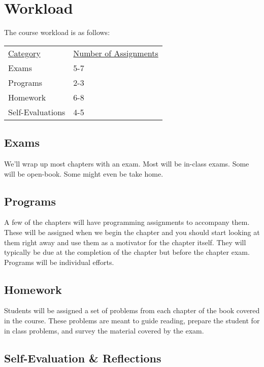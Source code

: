 \documentclass[10pt]{article}
\begin{document}
\section{Workload}

The course workload is as follows:
\begin{center}
  \begin{tabular}{ll}
    \underline{Category} & \underline{Number of Assignments} \\
    Exams & 5-7 \\
    Programs & 2-3 \\
    Homework & 6-8 \\
    Self-Evaluations & 4-5
  \end{tabular}
\end{center}

\subsection*{Exams}

We'll wrap up most chapters with an exam. Most will be in-class exams. Some will be open-book. Some might even be take home.

\subsection*{Programs}

A few of the chapters will have programming assignments to accompany them. These will be assigned when we begin the chapter and you should start looking at them right away and use them as a motivator for the chapter itself. They will typically be due at the completion of the chapter but before the chapter exam. Programs will be individual efforts.

\subsection*{Homework}

Students will be assigned a set of problems from each chapter of the book covered in the course. These problems are meant to guide reading, prepare the student for in class problems, and survey the material covered by the exam.

\subsection*{Self-Evaluation \& Reflections}
\end{document}
